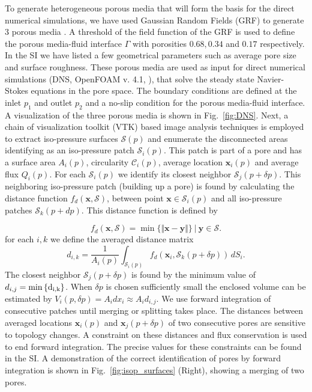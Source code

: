 \documentclass[draft]{agujournal2019}
\begin{document}
To generate heterogeneous porous media that will form the basis for the direct numerical simulations, we have used Gaussian Random Fields (GRF) to generate 3 porous media \cite{teubner_level_1991,hyman_heterogeneities_2012,siena_relationship_2014}. A threshold of the field function of the GRF is used to define the porous media-fluid interface $\Gamma$ with porosities $0.68, 0.34$ and $0.17$ respectively. In the SI we have listed a few geometrical parameters such as average pore size and surface roughness. These porous media are used as input for direct numerical simulations (DNS, OpenFOAM v. 4.1, ), that solve the steady state Navier-Stokes equations in the pore space. The boundary conditions are defined at the inlet $p_1$ and outlet $p_2$ and a no-slip condition for the porous media-fluid interface. A visualization of the three porous media is shown in Fig.~\ref{fig:DNS}. Next, a chain of visualization toolkit (VTK) based image analysis techniques \cite{schroeder_visualization_2006,hernderson_paraview_2007} is employed to extract iso-pressure surfaces $\mathcal{S}(p)$ and enumerate the disconnected areas identifying as an iso-pressure patch $\mathcal{S}_i(p)$. This patch is part of a pore and has a surface area $A_i(p)$, circularity $\mathcal{C}_i(p)$, average location $\mathbf{x}_i(p)$ and average flux $Q_i(p)$. For each $\mathcal{S}_i(p)$ we identify its closest neighbor $\mathcal{S}_j(p+\delta p)$. This neighboring iso-pressure patch (building up a pore) is found by calculating the distance function $f_d(\mathbf{x},\mathcal{S})$, between point $\mathbf{x}\in \mathcal{S}_i(p)$ and all iso-pressure patches $\mathcal{S}_k(p+dp)$. This distance function is defined by

\begin{equation}
	f_d\left(\mathbf{x},\mathcal{S}\right) = \min \{\Vert\mathbf{x}-\mathbf{y}\Vert \} ~|~ \mathbf{y}\in \mathcal{S}.
\end{equation}
for each $i,k$ we define the averaged distance matrix 
\begin{equation}
	d_{i,k} = \frac{1}{A_i(p)}\int_{\mathcal{S}_i(p)} f_d(\mathbf{x}_i,\mathcal{S}_k(p+\delta p)) \,dS_i.
\end{equation}
The closest neighbor $\mathcal{S}_j(p+\delta p)$ is found by the minimum value of $d_{i,j} = \rm{min}\left\{ d_{i,k}\right\}$. When $\delta p$ is chosen sufficiently small the enclosed volume can be estimated by $V_i(p,\delta p)=A_id x_i \approx A_i d_{i,j}$. We use forward integration of consecutive patches until merging or splitting takes place. The distances between averaged locations $\mathbf{x}_i(p)$ and $\mathbf{x}_j(p+\delta p)$ of two consecutive pores are sensitive to topology changes. A constraint on these distances and flux conservation is used to end forward integration. The precise values for these constraints can be found in the SI. A demonstration of the correct identification of pores by forward integration is shown in Fig.~\ref{fig:isop_surfaces} (Right), showing a merging of two pores. 
\end{document}
